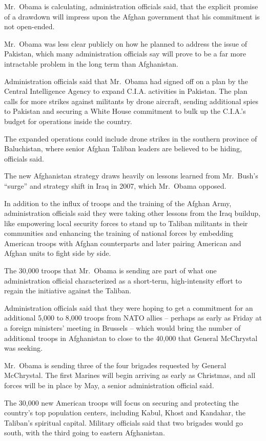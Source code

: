 ﻿\documentclass[12pt]{article}
\begin{document}
Mr.~Obama is calculating, administration officials said, that the explicit promise of a drawdown
will impress upon the Afghan government that his commitment is not open-ended.

Mr.~Obama was less clear publicly on how he planned to address the issue of Pakistan, which many
administration officials say will prove to be a far more intractable problem in the long term than
Afghanistan.

Administration officials said that Mr.~Obama had signed off on a plan by the Central Intelligence
Agency to expand C.I.A. activities in Pakistan. The plan calls for more strikes against militants by
drone aircraft, sending additional spies to Pakistan and securing a White House commitment to bulk
up the C.I.A.'s budget for operations inside the country.

The expanded operations could include drone strikes in the southern province of Baluchistan, where
senior Afghan Taliban leaders are believed to be hiding, officials said.

The new Afghanistan strategy draws heavily on lessons learned from Mr.~Bush's ``surge'' and strategy
shift in Iraq in 2007, which Mr.~Obama opposed.

In addition to the influx of troops and the training of the Afghan Army, administration officials
said they were taking other lessons from the Iraq buildup, like empowering local security forces to
stand up to Taliban militants in their communities and enhancing the training of national forces by
embedding American troops with Afghan counterparts and later pairing American and Afghan units to
fight side by side.

The 30,000 troops that Mr.~Obama is sending are part of what one administration official
characterized as a short-term, high-intensity effort to regain the initiative against the Taliban.

Administration officials said that they were hoping to get a commitment for an additional 5,000 to
8,000 troops from NATO allies -- perhaps as early as Friday at a foreign ministers' meeting in
Brussels -- which would bring the number of additional troops in Afghanistan to close to the 40,000
that General McChrystal was seeking.

Mr.~Obama is sending three of the four brigades requested by General McChrystal. The first Marines
will begin arriving as early as Christmas, and all forces will be in place by May, a senior
administration official said.

The 30,000 new American troops will focus on securing and protecting the country's top population
centers, including Kabul, Khost and Kandahar, the Taliban's spiritual capital. Military officials
said that two brigades would go south, with the third going to eastern Afghanistan.
\end{document}
